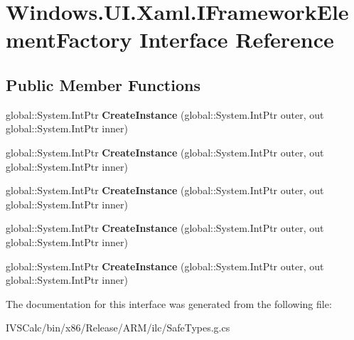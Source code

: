 \hypertarget{interface_windows_1_1_u_i_1_1_xaml_1_1_i_framework_element_factory}{}\section{Windows.\+U\+I.\+Xaml.\+I\+Framework\+Element\+Factory Interface Reference}
\label{interface_windows_1_1_u_i_1_1_xaml_1_1_i_framework_element_factory}
\subsection*{Public Member Functions}
\begin{DoxyCompactItemize}
\item 
\mbox{\label{interface_windows_1_1_u_i_1_1_xaml_1_1_i_framework_element_factory_aa5e8b4f0efbf1fd2afdd379d6a59b5cf}} 
global\+::\+System.\+Int\+Ptr {\bfseries Create\+Instance} (global\+::\+System.\+Int\+Ptr outer, out global\+::\+System.\+Int\+Ptr inner)
\item 
\mbox{\label{interface_windows_1_1_u_i_1_1_xaml_1_1_i_framework_element_factory_aa5e8b4f0efbf1fd2afdd379d6a59b5cf}} 
global\+::\+System.\+Int\+Ptr {\bfseries Create\+Instance} (global\+::\+System.\+Int\+Ptr outer, out global\+::\+System.\+Int\+Ptr inner)
\item 
\mbox{\label{interface_windows_1_1_u_i_1_1_xaml_1_1_i_framework_element_factory_aa5e8b4f0efbf1fd2afdd379d6a59b5cf}} 
global\+::\+System.\+Int\+Ptr {\bfseries Create\+Instance} (global\+::\+System.\+Int\+Ptr outer, out global\+::\+System.\+Int\+Ptr inner)
\item 
\mbox{\label{interface_windows_1_1_u_i_1_1_xaml_1_1_i_framework_element_factory_aa5e8b4f0efbf1fd2afdd379d6a59b5cf}} 
global\+::\+System.\+Int\+Ptr {\bfseries Create\+Instance} (global\+::\+System.\+Int\+Ptr outer, out global\+::\+System.\+Int\+Ptr inner)
\item 
\mbox{\label{interface_windows_1_1_u_i_1_1_xaml_1_1_i_framework_element_factory_aa5e8b4f0efbf1fd2afdd379d6a59b5cf}} 
global\+::\+System.\+Int\+Ptr {\bfseries Create\+Instance} (global\+::\+System.\+Int\+Ptr outer, out global\+::\+System.\+Int\+Ptr inner)
\end{DoxyCompactItemize}


The documentation for this interface was generated from the following file\+:\begin{DoxyCompactItemize}
\item 
I\+V\+S\+Calc/bin/x86/\+Release/\+A\+R\+M/ilc/Safe\+Types.\+g.\+cs\end{DoxyCompactItemize}
